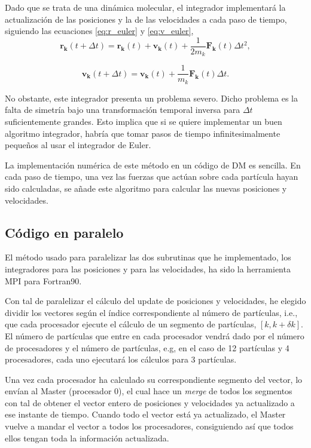 \documentclass[onecolumn]{article}
\renewcommand{\vec}[1]{\mathbf{#1}}
\begin{document}
Dado que se trata de una dinámica molecular, el integrador implementará la actualización de las posiciones y la de las velocidades
a cada paso de tiempo, siguiendo las ecuaciones \eqref{eq:r_euler} y \eqref{eq:v_euler},
\begin{equation}\label{eq:r_euler} 
\vec{r_k}(t+\Delta t) = \vec{r_k}(t) + \vec{v_k}(t) + \frac{1}{2m_k}\vec{F_k}(t)\Delta t^2 ,
\end{equation}

\begin{equation}\label{eq:v_euler} 
\vec{v_k}(t+\Delta t) = \vec{v_k}(t) + \frac{1}{m_k}\vec{F_k}(t)\Delta t .
\end{equation}

No obstante, este integrador presenta un problema severo. Dicho problema es la falta de simetría bajo una transformación temporal inversa para $\Delta t$ 
suficientemente grandes. Esto implica que si se quiere implementar un buen algoritmo integrador, habría que tomar pasos de tiempo infinitesimalmente pequeños
al usar el integrador de Euler.

La implementación numérica de este método en un código de DM es sencilla. En cada paso de tiempo, una vez las fuerzas que actúan sobre cada partícula hayan sido
calculadas, se añade este algoritmo para calcular las nuevas posiciones y velocidades.

\subsection{Código en paralelo}
 
 El método usado para paralelizar las dos subrutinas que he implementado, los integradores para las posiciones y para las velocidades, ha sido la herramienta MPI para
 Fortran90.
 
 Con tal de paralelizar el cálculo del update de posiciones y velocidades, he elegido dividir los vectores según el índice correspondiente al número de partículas, i.e.,
 que cada procesador ejecute el cálculo de un segmento de partículas, $[k , k + \delta k]$. El número de partículas que entre en cada procesador vendrá dado por el número
 de procesadores y el número de partículas, e.g, en el caso de 12 partículas y 4 procesadores, cada uno ejecutará los cálculos para 3 partículas.
 
 Una vez cada procesador ha calculado su correspondiente segmento del vector, lo envían al Master (procesador 0), el cual hace un \textit{merge} de todos los segmentos
 con tal de obtener el vector entero de posiciones y velocidades ya actualizado a ese instante de tiempo. Cuando todo el vector está ya actualizado, el Master vuelve a mandar
 el vector a todos los procesadores, consiguiendo así que todos ellos tengan toda la información actualizada.
 
\end{document}
